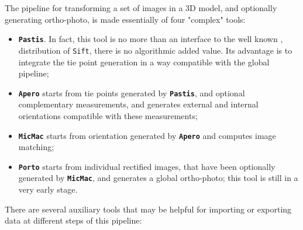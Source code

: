 The pipeline for transforming a set of images in a 3D model, and optionally
generating ortho-photo, is made essentially of four
"complex" tools:


\begin{itemize}
   \item {\tt \bf Pastis}. In fact, this tool is no more than an interface to the
         well known \SiftPP, distribution of {\tt Sift}, there is no algorithmic
         added value. Its advantage is to integrate the tie point generation
         in a way compatible with the global pipeline;

   \item {\tt \bf Apero} starts from tie points generated by {\tt \bf Pastis},
         and optional complementary measurements, and generates external and internal
         orientations compatible with these measurements;

   \item {\tt \bf MicMac} starts from orientation generated by {\tt \bf Apero} and
         computes image matching;


   \item {\tt \bf Porto}  starts from individual rectified images, that have been
         optionally generated by  {\tt \bf MicMac}, and generates a global ortho-photo;
         this tool is still in a very early stage.
\end{itemize}

There are several auxiliary tools that may be helpful for importing or
exporting data at different steps of this pipeline:


